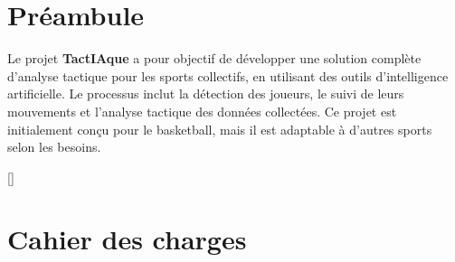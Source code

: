 \documentclass[a4paper,13pt]{book}
\newcommand\mychapter{\titleformat{\chapter}[block]{}{}{0pt}{\centering\hrule height 5pt
		\vglue-1.1 \baselineskip
		\tcbox[enhanced,colback=white,frame code={}]{\bfseries\chaptername\hskip2mm \thechapter}
		\bigskip
		\vglue-3mm\hrule \vglue3mm
		{\huge \bfseries ##1}\vglue3mm\hrule
	}[]\chapter}
\begin{document}
\setcounter{tocdepth}{5}
\setcounter{secnumdepth}{5}
\tableofcontents
\chapter*{Préambule}
Le projet \textbf{TactIAque} a pour objectif de développer une solution complète d’analyse tactique pour les sports collectifs, en utilisant des outils d’intelligence artificielle. Le processus inclut la détection des joueurs, le suivi de leurs mouvements et l’analyse tactique des données collectées. Ce projet est initialement conçu pour le basketball, mais il est adaptable à d’autres sports selon les besoins.
\mychapter{Cahier des charges}
\minitoc
\newpage

\end{document}
